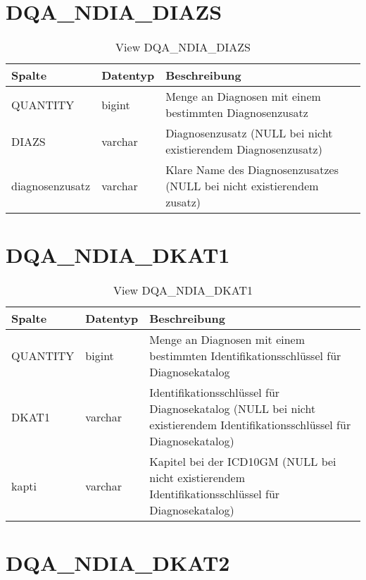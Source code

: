  \section{DQA\_NDIA\_DIAZS}

  \begin{table}[ht]
    \centering
    \caption{View DQA\_NDIA\_DIAZS}
    \label{tab:dqandiadiazs}
    \begin{tabular}{||l|l|p{10cm}||}
      \hline
      Spalte & Datentyp & Beschreibung \\ [0.5ex] \hline \hline
QUANTITY & bigint & Menge an Diagnosen mit einem bestimmten Diagnosenzusatz \\ \hline
DIAZS & varchar & Diagnosenzusatz (NULL bei nicht existierendem Diagnosenzusatz)\\ \hline
diagnosenzusatz & varchar & Klare Name des Diagnosenzusatzes (NULL bei nicht existierendem zusatz)\\ \hline
    \end{tabular}
  \end{table}
 \clearpage
  \section{DQA\_NDIA\_DKAT1}

  \begin{table}[ht]
    \centering
    \caption{View DQA\_NDIA\_DKAT1}
    \label{tab:dqandiadkat1}
    \begin{tabular}{||l|l|p{10cm}||}
      \hline
      Spalte & Datentyp & Beschreibung \\ [0.5ex] \hline \hline
QUANTITY & bigint & Menge an Diagnosen mit einem bestimmten Identifikationsschlüssel für Diagnosekatalog \\ \hline
DKAT1 & varchar & Identifikationsschlüssel für Diagnosekatalog (NULL bei nicht existierendem Identifikationsschlüssel für Diagnosekatalog)\\ \hline
kapti & varchar & Kapitel bei der ICD10GM (NULL bei nicht existierendem Identifikationsschlüssel für Diagnosekatalog)\\ \hline
    \end{tabular}
  \end{table}

  \section{DQA\_NDIA\_DKAT2}

